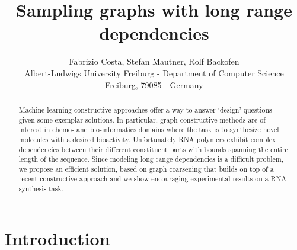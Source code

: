 \documentclass[a4paper]{esannV2}
\begin{document}
\title{Sampling graphs with long range dependencies}

\author{Fabrizio Costa, Stefan Mautner, Rolf Backofen
%
%
\vspace{.3cm}\\
%
Albert-Ludwigs University Freiburg - Department of Computer Science\\
Freiburg, 79085 - Germany \\
%
}




  


\maketitle

\begin{abstract}
Machine learning constructive approaches offer a way to answer
`design' questions given some exemplar solutions.  In particular,
graph constructive methods are of interest in chemo- and bio-informatics
domains where the task is to synthesize novel molecules with a desired
bioactivity. Unfortunately RNA polymers exhibit complex dependencies between
their different constituent parts with bounds spanning the entire length of
the sequence. Since modeling long range dependencies is a difficult problem,
we propose an efficient solution, based on graph coarsening that builds on top
of a recent constructive approach and we show encouraging experimental results
on a RNA synthesis task.
\end{abstract}



\section{Introduction}
\end{document}
